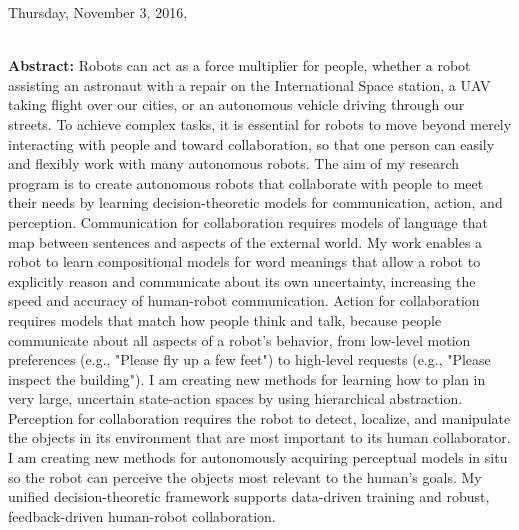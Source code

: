 \begin{center}
Thursday, November 3, 2016,  \vspace{1em}
\\
 \PlenaryLoc \\
 \vspace{1em}

\par\end{center}

\noindent \textbf{Abstract:} 
Robots can act as a force multiplier for people, whether a robot assisting an astronaut with a repair on the International Space station, a UAV taking flight over our cities, or an autonomous vehicle driving through our streets. To achieve complex tasks, it is essential for robots to move beyond merely interacting with people and toward collaboration, so that one person can easily and flexibly work with many autonomous robots. The aim of my research program is to create autonomous robots that collaborate with people to meet their needs by learning decision-theoretic models for communication, action, and perception. Communication for collaboration requires models of language that map between sentences and aspects of the external world. My work enables a robot to learn compositional models for word meanings that allow a robot to explicitly reason and communicate about its own uncertainty, increasing the speed and accuracy of human-robot communication. Action for collaboration requires models that match how people think and talk, because people communicate about all aspects of a robot's behavior, from low-level motion preferences (e.g., "Please fly up a few feet") to high-level requests (e.g., "Please inspect the building"). I am creating new methods for learning how to plan in very large, uncertain state-action spaces by using hierarchical abstraction. Perception for collaboration requires the robot to detect, localize, and manipulate the objects in its environment that are most important to its human collaborator. I am creating new methods for autonomously acquiring perceptual models in situ so the robot can perceive the objects most relevant to the human's goals. My unified decision-theoretic framework supports data-driven training and robust, feedback-driven human-robot collaboration. 

\vspace{3em}

